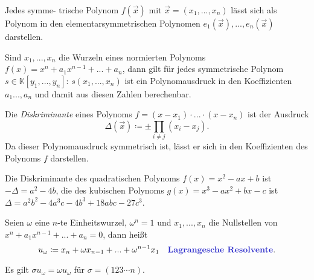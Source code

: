 \documentclass{cheat-sheet}
\newcommand{\K}{\mathbb{K}} %
\begin{document}

\begin{satz}
  Jedes symme- trische Polynom $f(\vec{x})$ mit $\vec{x} = (x_1, ..., x_n)$ lässt sich als Polynom in den elementarsymmetrischen Polynomen $e_1(\vec{x}), ..., e_n(\vec{x})$ darstellen.
\end{satz}

\begin{kor}
  Sind $x_1, ..., x_n$ die Wurzeln eines normierten Polynoms $f(x) = x^n + a_1 x^{n-1} + ... + a_n$, dann gilt für jedes symmetrische Polynom $s \in \K[y_1, ..., y_n]$: $s(x_1, ..., x_n)$ ist ein Polynomausdruck in den Koeffizienten $a_1 ..., a_n$ und damit aus diesen Zahlen berechenbar.
\end{kor}

\begin{defn}
  Die \emph{Diskriminante} eines Polynoms $f = (x - x_1) \cdot ... \cdot (x - x_n)$ ist der Ausdruck
  \[ \Delta (\vec{x}) \coloneqq \pm \prod_{i \not= j} (x_i - x_j). \]
  Da dieser Polynomausdruck symmetrisch ist, lässt er sich in den Koeffizienten des Polynoms $f$ darstellen.
\end{defn}

\begin{bsp}
  Die Diskriminante des quadratischen Polynoms $f(x) = x^2 - ax + b$ ist $- \Delta = a^2 - 4 b$, die des kubischen Polynoms $g(x) = x^3 - a x^2 + b x - c$ ist $\Delta = a^2 b^2 - 4 a^3 c - 4 b^3 + 18 abc - 27 c^3$.
\end{bsp}



\begin{defn}
  Seien $\omega$ eine $n$-te Einheitswurzel, \dh{} $\omega^n = 1$ und $x_1, ..., x_n$ die Nullstellen von $x^n + a_1 x^{n-1} + ... + a_n = 0$, dann heißt
  \[
    u_{\omega} \coloneqq x_n + \omega x_{n-1} + ... + \omega^{n-1} x_1 \quad
    \text{\emph{Lagrangesche Resolvente}.}
  \]
\end{defn}

\begin{bem}
  Es gilt $\sigma u_{\omega} = \omega u_{\omega}$ für $\sigma = (123 \cdots n)$.
\end{bem}


\end{document}
